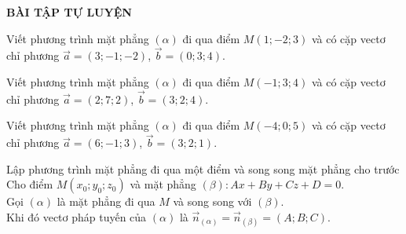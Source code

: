 \begin{center}
    \textbf{BÀI TẬP TỰ LUYỆN}
\end{center}

\begin{bt}%
    Viết phương trình mặt phẳng $(\alpha)$ đi qua điểm $M\left(1;-2;3\right)$ và có cặp vectơ chỉ phương $\overrightarrow{a}=\left(3;-1;-2\right)$, $\overrightarrow{b}=\left(0;3;4\right)$.
\end{bt}

\begin{bt}%
    Viết phương trình mặt phẳng $(\alpha)$ đi qua điểm $M\left(-1;3;4\right)$ và có cặp vectơ chỉ phương $\overrightarrow{a}=\left(2;7;2\right)$, $\overrightarrow{b}=\left(3;2;4\right)$.
\end{bt}

\begin{bt}%
Viết phương trình mặt phẳng $(\alpha)$ đi qua điểm $M\left(-4;0;5\right)$ và có cặp vectơ chỉ phương $\overrightarrow{a}=\left(6;-1;3\right)$, $\overrightarrow{b}=\left(3;2;1\right)$.
\end{bt}

\begin{dang}{Lập phương trình mặt phẳng đi qua một điểm và song song mặt phẳng cho trước}
  Cho điểm $M\left(x_0;y_0;z_0\right)$ và mặt phẳng $(\beta): Ax+By+Cz+D=0$.\\
  Gọi $(\alpha)$ là mặt phẳng đi qua $M$ và song song với $(\beta)$.\\
Khi đó vectơ pháp tuyến của $(\alpha)$ là $\overrightarrow{n}_{(\alpha)}=\overrightarrow{n}_{(\beta)}=\left(A;B;C\right)$.  
\end{dang}


